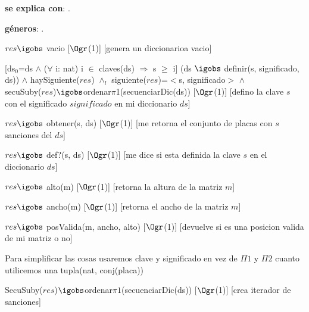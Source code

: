 \begin{Interfaz}

	\textbf{se explica con}: .

	\textbf{géneros}: .


	{$res \igobs$ vacio}
	[$\Ogr$(1)]
	[genera un diccionarioa vacio]

	[ds$_0$=ds $\land$ ($\forall$ i: nat) i $\in$ claves(ds) $\Rightarrow$ s $\geq$ i]
	{(ds $\igobs$ definir(s, significado, ds)) $\land$ haySiguiente($res$) $\land_l$ siguiente($res$)=$<$s, significado$>$ $\land$\\
	secuSuby($res$)$\igobs$ordenar$\pi$1(secuenciarDic(ds))}%
	[$\Ogr$(1)]
	[defino la clave $s$ con el significado $significado$ en mi diccionario $ds$]
	
	{$res \igobs$ obtener(s, ds)}
	[$\Ogr$(1)]
	[me retorna el conjunto de placas con $s$ sanciones del $ds$]

	{$res \igobs$ def?(s, ds)}  
	[$\Ogr$(1)]
	[me dice si esta definida la clave $s$ en el diccionario $ds$]

	{$res \igobs$ alto(m)}  
	[$\Ogr$(1)]
	[retorna la altura de la matriz $m$]

	{$res \igobs$ ancho(m)}  
	[$\Ogr$(1)]
	[retorna el ancho de la matriz $m$]

	{$res \igobs$ posValida(m, ancho, alto)}  
	[$\Ogr$(1)]
	[devuelve si es una posicion valida de mi matriz o no]
	
	
	
	
	Para simplificar las cosas usaremos clave y significado en vez de $\Pi1$ y $\Pi2$ cuanto utilicemos una tupla(nat, conj(placa))
	
	{SecuSuby($res$)$\igobs$ordenar$\pi1$(secuenciarDic(ds))}
	[$\Ogr$(1)]
	[crea iterador de sanciones]
	

\end{Interfaz}
